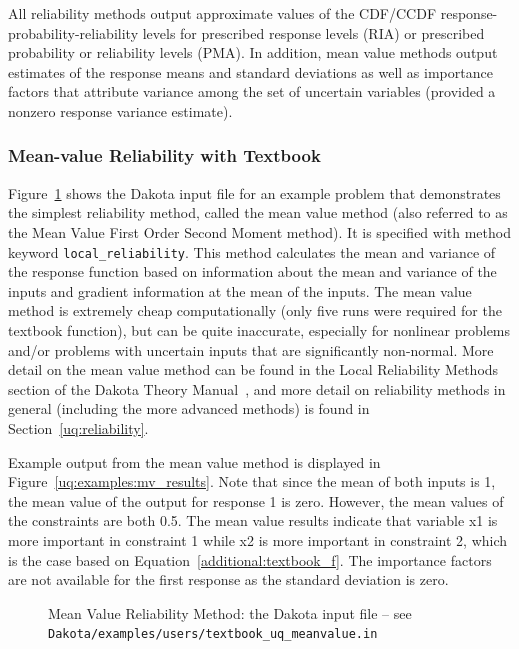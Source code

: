 All reliability methods output approximate values of the CDF/CCDF
response-probability-reliability levels for prescribed response levels
(RIA) or prescribed probability or reliability levels (PMA). In
addition, mean value methods output estimates of the response means
and standard deviations as well as importance factors that attribute
variance among the set of uncertain variables (provided a nonzero
response variance estimate).

\subsubsection{Mean-value Reliability with Textbook}
\label{uq:examples:mv}

Figure~\ref{uq:examples:mv_input} shows the Dakota input file for an
example problem that demonstrates the simplest reliability method,
called the mean value method (also referred to as the Mean Value First
Order Second Moment method). It is specified with method keyword
\texttt{local\_reliability}. This method calculates the mean and
variance of the response function based on information about the mean
and variance of the inputs and gradient information at the mean of the
inputs. The mean value method is extremely cheap computationally (only
five runs were required for the textbook function), but can be quite
inaccurate, especially for nonlinear problems and/or problems with
uncertain inputs that are significantly non-normal. More detail on the
mean value method can be found in the Local Reliability Methods
section of the Dakota Theory Manual~\cite{TheoMan}, and more detail on
reliability methods in general (including the more advanced methods)
is found in Section~\ref{uq:reliability}.

Example output from the mean value method is displayed in
Figure~\ref{uq:examples:mv_results}. Note that since the mean of both
inputs is 1, the mean value of the output for response 1 is zero.
However, the mean values of the constraints are both 0.5.  The mean
value results indicate that variable x1 is more important in
constraint 1 while x2 is more important in constraint 2, which is the
case based on Equation~\ref{additional:textbook_f}.  The importance
factors are not available for the first response as the standard
deviation is zero.

\begin{figure}[htbp!]
  \centering
  \begin{bigbox}
    \begin{small}
    \end{small}
  \end{bigbox}
  \caption{Mean Value Reliability Method: the Dakota input file --
see \texttt{Dakota/examples/users/textbook\_uq\_meanvalue.in} }
  \label{uq:examples:mv_input}
\end{figure}

